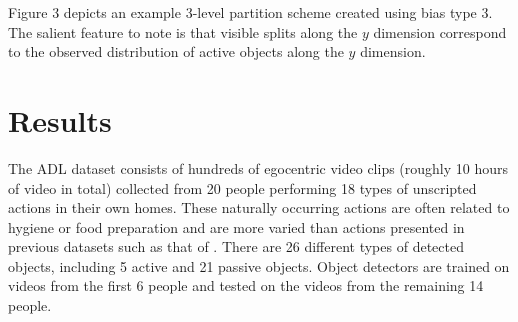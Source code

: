 \documentclass{bmvc2k}
\begin{document}
  Figure 3 depicts an example 3-level partition scheme created using bias
  type 3. The salient feature to note is that visible splits along the $y$
  dimension correspond to the observed distribution of active objects along
  the $y$ dimension.

  \iffalse
  \begin{figure}[t]
    \begin{center}
		 \texttt{[image: /u/tomas/thesis/figures/lvl3-3.png]}
    \end{center}
		   \caption{An example biased (type 3) partitioning scheme corresponding to a 3-level
       pyramid. Splits along the lower portion of the $y$ dimension are
     visible, corresponding to the tendency for active objects to appear in
   the lower area of the field of view.}
			\label{fig:long}
			\label{fig:onecol}
  \end{figure}
  \fi

\section{Results}
  The ADL dataset consists of hundreds of egocentric video clips
	(roughly 10 hours of video in total) collected from 20 people performing
	18 types of unscripted actions in their own homes. These naturally
  occurring
  actions are often related to hygiene or food preparation and are more
  varied than actions presented in previous datasets such as that of \cite{Fathi11}.
  There are 26 different 
	types of detected objects, including 5 active and 21 passive objects. 
  Object detectors are trained on videos from the
  first 6 people and tested on the videos from the remaining 14 people.
  
\end{document}
